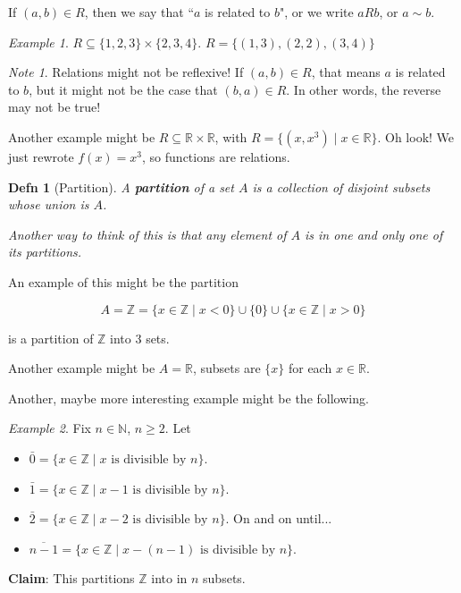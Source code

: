 \documentclass[12pt]{article}
\def\N{{\mathbb N}}
\def\Z{{\mathbb Z}}
\def\R{{\mathbb R}}
\newtheorem{definition}{Defn}
\theoremstyle{remark}
\theoremstyle{remark}
\theoremstyle{remark}
\newtheorem{example}{Example}
\theoremstyle{remark}
\theoremstyle{remark}
\newtheorem*{note}{Note}
\begin{document}
If $(a, b) \in R$, then we say that ``$a$ is related to $b$", or we write
$aRb$, or $a \sim b$.

\begin{example}
	$R \subseteq \{1, 2, 3\} \times \{2, 3, 4\}$. $R = \{(1, 3), (2, 2), (3, 4) \}$
\end{example}

\begin{note}
	Relations might not be reflexive! If $(a, b) \in R$, that means $a$ is
	related to $b$, but it might not be the case that $(b, a) \in R$. In other
	words, the reverse may not be true!
\end{note}

Another example might be $R \subseteq \R \times \R$, with $R = \{(x, x^3) \mid x
	\in \R \}$. Oh look! We just rewrote $f(x) = x^3$, so functions are relations.

\begin{definition}[Partition]
	A {\bf partition} of a set $A$ is a collection of {\it disjoint} subsets
	whose union is $A$.

	Another way to think of this is that any element of $A$ is in one and only
	one of its partitions.
\end{definition}

An example of this might be the partition

\[
	A = \Z = \{x \in \Z \mid x < 0 \} \cup \{ 0 \} \cup \{ x \in \Z \mid x > 0 \}
\]

is a partition of $\Z$ into 3 sets.

Another example might be $A = \R$, subsets are $\{ x \}$ for each $x \in \R$.

Another, maybe more interesting example might be the following.

\begin{example}
  Fix $n \in \N$, $n \ge 2$. Let

  \begin{itemize}
    \item $\bar 0 = \{x \in \Z \mid x \text{ is divisible by } n \}$.
    \item $\bar 1 = \{x \in \Z \mid x - 1 \text{ is divisible by } n \}$.
    \item $\bar 2 = \{x \in \Z \mid x - 2 \text{ is divisible by } n \}$. On and
          on until...
    \item $\overline{n - 1} = \{x \in \Z \mid x - (n - 1) \text{ is divisible by } n
            \}$.
  \end{itemize}

  {\bf Claim}: This partitions $\Z$ into in $n$ subsets.
\end{example}
\end{document}
